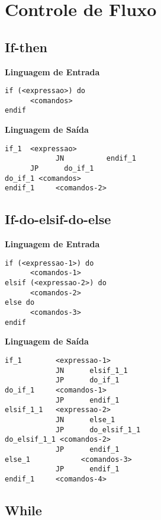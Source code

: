 \label{Cap:Tradução de comandos}

\section{Controle de Fluxo}

\subsection{If-then}

\textbf{Linguagem de Entrada}\\
\begin{lstlisting}
if (<expressao>) do
      <comandos>
endif
\end{lstlisting}

\textbf{Linguagem de Saída}\\

\begin{lstlisting}
if_1  <expressao>
            JN          endif_1
      JP      do_if_1
do_if_1 <comandos>
endif_1     <comandos-2>
\end{lstlisting}

\subsection{If-do-elsif-do-else}

\textbf{Linguagem de Entrada}\\

\begin{lstlisting}
if (<expressao-1>) do
      <comandos-1>
elsif (<expressao-2>) do
      <comandos-2>
else do
      <comandos-3>
endif
\end{lstlisting}

\textbf{Linguagem de Saída}\\

\begin{lstlisting}
if_1        <expressao-1>
            JN      elsif_1_1
            JP      do_if_1
do_if_1     <comandos-1>
            JP      endif_1
elsif_1_1   <expressao-2>
            JN      else_1
            JP      do_elsif_1_1
do_elsif_1_1 <comandos-2>
            JP      endif_1
else_1            <comandos-3>
            JP      endif_1
endif_1     <comandos-4>

\end{lstlisting}

\subsection{While}

